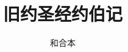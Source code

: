\documentclass[12pt,oneside]{book}
\begin{document}
\title{旧约圣经约伯记}
\author{和合本}

\makemytitleA
\end{document}

